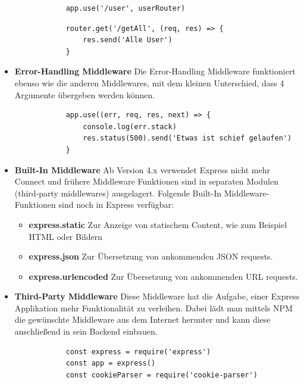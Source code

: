 \begin{itemize}
\begin{lstlisting}
            app.use('/user', userRouter)
        \end{lstlisting}

        \begin{lstlisting}
            router.get('/getAll', (req, res) => {
                res.send('Alle User')
            }
        \end{lstlisting}
    \item \textbf{Error-Handling Middleware}
        \newline
        Die Error-Handling Middleware funktioniert ebenso wie die anderen Middlewares, mit dem kleinen Unterschied, dass 4 Argumente übergeben werden können.
        \begin{lstlisting}
            app.use((err, req, res, next) => {
                console.log(err.stack)
                res.status(500).send('Etwas ist schief gelaufen')
            }
        \end{lstlisting}
    \item \textbf{Built-In Middleware}
        \newline
        Ab Version 4.x verwendet Express nicht mehr Connect und frühere Middleware Funktionen sind in separaten Modulen (third-party middlewares) ausgelagert. Folgende Built-In Middleware-Funktionen sind noch in Express verfügbar:
        \begin{itemize}
            \item \textbf{express.static}
                \newline
                Zur Anzeige von statischem Content, wie zum Beispiel HTML oder Bildern
            \item \textbf{express.json}
                \newline
                Zur Übersetzung von ankommenden JSON requests.
            \item \textbf{express.urlencoded}
                \newline
                Zur Übersetzung von ankommenden URL requests.
        \end{itemize}
    \item \textbf{Third-Party Middleware}
        \newline
        Diese Middleware hat die Aufgabe, einer Express Applikation mehr Funktionalität zu verleihen. Dabei lädt man mittels NPM die gewünschte Middleware aus dem Internet herunter und kann diese anschließend in sein Backend einbauen.
        \begin{lstlisting}
            const express = require('express')
            const app = express()
            const cookieParser = require('cookie-parser')


\end{lstlisting}
\end{itemize}
